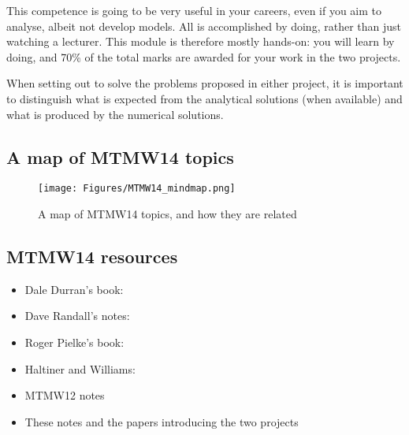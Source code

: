 \documentclass[11pt,fleqn]{book} %
\begin{document}
	This competence is going to be very useful in your careers, even if you aim to analyse, albeit not develop models. All is accomplished by doing, rather than just watching a lecturer.  This module is therefore mostly hands-on: you will learn by doing, and 70\% of the total marks are awarded for your work in the two projects. 

\vspace{1em}

\vspace{1em}

\vspace{1em}
		
When setting out to solve the problems proposed in either project, it is important to distinguish what is expected from the analytical solutions (when available) and what is produced by the numerical solutions.
	
	\subsection{A map of MTMW14 topics}
	\begin{figure}[h!]
	\texttt{[image: Figures/MTMW14\_mindmap.png]}
	\caption{A map of MTMW14 topics, and how they are related}
	\end{figure}
	
	\subsection{MTMW14 resources}
	
	\begin{itemize}
		\item	Dale Durran's book:  \cite {Durran-book}
		\item	Dave Randall's notes:  \cite{Randall-notes}
		\item   Roger Pielke's book:  \cite {Pielke-book}
		\item   Haltiner and Williams:  \cite {Haltiner-Williams-book}
		\item	MTMW12 notes
		\item	These notes and the papers introducing the two projects		
	\end{itemize}
	
\end{document}
